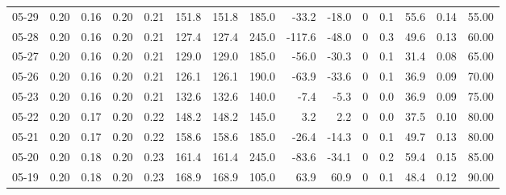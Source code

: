 \begin{threeparttable}
{\begin{tabular}{lrrrrrrrrrrrrrr}
  05-29 &          0.20 &          0.16 &          0.20 &        0.21 &               151.8 &              151.8 &               185.0 &      -33.2 &        -18.0 &              0 &                 0.1 &             55.6 &            0.14 &                  55.00 \\
  05-28 &          0.20 &          0.16 &          0.20 &        0.21 &               127.4 &              127.4 &               245.0 &     -117.6 &        -48.0 &              0 &                 0.3 &             49.6 &            0.13 &                  60.00 \\
  05-27 &          0.20 &          0.16 &          0.20 &        0.21 &               129.0 &              129.0 &               185.0 &      -56.0 &        -30.3 &              0 &                 0.1 &             31.4 &            0.08 &                  65.00 \\
  05-26 &          0.20 &          0.16 &          0.20 &        0.21 &               126.1 &              126.1 &               190.0 &      -63.9 &        -33.6 &              0 &                 0.1 &             36.9 &            0.09 &                  70.00 \\
  05-23 &          0.20 &          0.16 &          0.20 &        0.21 &               132.6 &              132.6 &               140.0 &       -7.4 &         -5.3 &              0 &                 0.0 &             36.9 &            0.09 &                  75.00 \\
  05-22 &          0.20 &          0.17 &          0.20 &        0.22 &               148.2 &              148.2 &               145.0 &        3.2 &          2.2 &              0 &                 0.0 &             37.5 &            0.10 &                  80.00 \\
  05-21 &          0.20 &          0.17 &          0.20 &        0.22 &               158.6 &              158.6 &               185.0 &      -26.4 &        -14.3 &              0 &                 0.1 &             49.7 &            0.13 &                  80.00 \\
  05-20 &          0.20 &          0.18 &          0.20 &        0.23 &               161.4 &              161.4 &               245.0 &      -83.6 &        -34.1 &              0 &                 0.2 &             59.4 &            0.15 &                  85.00 \\
  05-19 &          0.20 &          0.18 &          0.20 &        0.23 &               168.9 &              168.9 &               105.0 &       63.9 &         60.9 &              0 &                 0.1 &             48.4 &            0.12 &                  90.00 \\

\end{tabular}}
\end{threeparttable}

